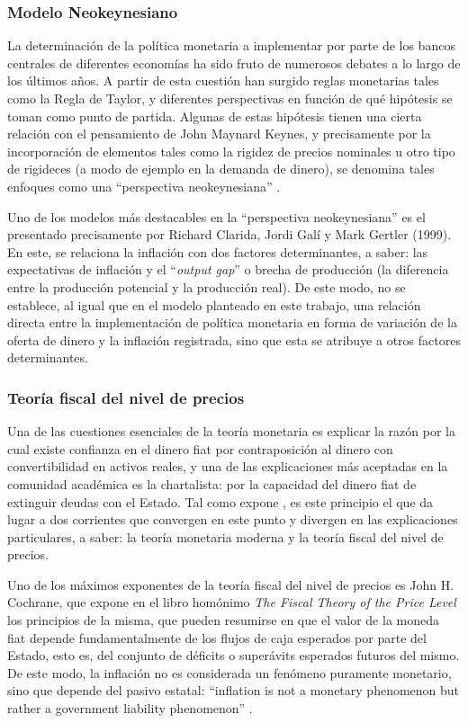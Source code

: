 \documentclass[titlepage, 12pt]{article}
\begin{document}
\subsubsection{Modelo Neokeynesiano}\label{modelo-neokeynesiano}
La determinación de la política monetaria a implementar por parte de los bancos centrales de diferentes economías ha sido fruto de numerosos debates a lo largo de los últimos años. A partir de esta cuestión han surgido reglas monetarias tales como la Regla de Taylor, y diferentes perspectivas en función de qué hipótesis se toman como punto de partida. Algunas de estas hipótesis tienen una cierta relación con el pensamiento de John Maynard Keynes, y precisamente por la incorporación de elementos tales como la rigidez de precios nominales u otro tipo de rigideces (a modo de ejemplo en la demanda de dinero), se denomina tales enfoques como una \enquote{perspectiva neokeynesiana} \autocite[1662]{clarida1999}.

Uno de los modelos más destacables en la \enquote{perspectiva neokeynesiana} es el presentado precisamente por Richard Clarida, Jordi Galí y Mark Gertler (1999). En este, se relaciona la inflación con dos factores determinantes, a saber: las expectativas de inflación y el \enquote{\textit{output gap}} o brecha de producción (la diferencia entre la producción potencial y la producción real). De este modo, no se establece, al igual que en el modelo planteado en este trabajo, una relación directa entre la implementación de política monetaria en forma de variación de la oferta de dinero y la inflación registrada, sino que esta se atribuye a otros factores determinantes.

\subsubsection{Teoría fiscal del nivel de precios}
Una de las cuestiones esenciales de la teoría monetaria es explicar la razón por la cual existe confianza en el dinero fiat por contraposición al dinero con convertibilidad en activos reales, y una de las explicaciones más aceptadas en la comunidad académica es la chartalista: por la capacidad del dinero fiat de extinguir deudas con el Estado. Tal como expone \cite{ben_gad2023}, es este principio el que da lugar a dos corrientes que convergen en este punto y divergen en las explicaciones particulares, a saber: la teoría monetaria moderna y la teoría fiscal del nivel de precios.

Uno de los máximos exponentes de la teoría fiscal del nivel de precios es John H. Cochrane, que expone en el libro homónimo \textit{The Fiscal Theory of the Price Level} \autocite*{cochrane2023} los principios de la misma, que pueden resumirse en que el valor de la moneda fiat depende fundamentalmente de los flujos de caja esperados por parte del Estado, esto es, del conjunto de déficits o superávits esperados futuros del mismo. De este modo, la inflación no es considerada un fenómeno puramente monetario, sino que depende del pasivo estatal: \enquote{inflation is not a monetary phenomenon but rather a government liability phenomenon} \autocite[305]{ben_gad2023}.
\end{document}
